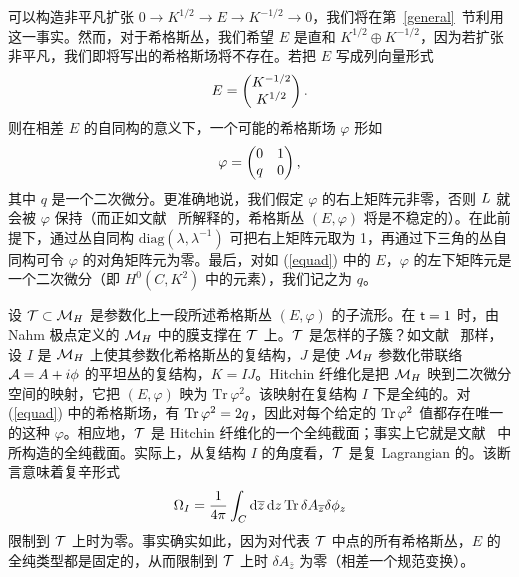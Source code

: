 可以构造非平凡扩张 $0\to K^{1/2}\to E\to K^{-1/2}\to 0$，我们将在第~\ref{general}~节利用这一事实。然而，对于希格斯丛，我们希望 $E$ 是直和 $K^{1/2}\oplus K^{-1/2}$，因为若扩张非平凡，我们即将写出的希格斯场将不存在。若把 $E$ 写成列向量形式
\begin{equation}\label{equad} E=\begin{pmatrix}K^{-1/2}\cr K^{1/2}\end{pmatrix}.\end{equation}
则在相差 $E$ 的自同构的意义下，一个可能的希格斯场 $\varphi$ 形如
\begin{equation}\label{varph}\varphi=\begin{pmatrix}0 & 1\cr q & 0 \end{pmatrix},\end{equation}
其中 $q$ 是一个二次微分。更准确地说，我们假定 $\varphi$ 的右上矩阵元非零，否则 ${ L}$ 就会被 $\varphi$ 保持（而正如文献~\cite{Hitchin} 所解释的，希格斯丛 $(E,\varphi)$ 将是不稳定的）。在此前提下，通过丛自同构 $\mathrm{diag}(\lambda,\lambda^{-1})$ 可把右上矩阵元取为 1，再通过下三角的丛自同构可令 $\varphi$ 的对角矩阵元为零。最后，对如 (\ref{equad}) 中的 $E$，$\varphi$ 的左下矩阵元是一个二次微分（即 $H^0(C,K^2)$ 中的元素），我们记之为 $q$。


设 ${\mathcal T}\subset {\mathcal M}_H$ 是参数化上一段所述希格斯丛 $(E,\varphi)$ 的子流形。在 ${ \sf t}=1$ 时，由 Nahm 极点定义的 ${\mathcal M}_H$ 中的膜支撑在 ${\mathcal T}$ 上。${\mathcal T}$ 是怎样的子簇？如文献~\cite{Hitchin} 那样，设 $I$ 是 ${\mathcal M}_H$ 上使其参数化希格斯丛的复结构，$J$ 是使 ${\mathcal M}_H$ 参数化带联络 ${\mathcal A}=A+i\phi$ 的平坦丛的复结构，$K=IJ$。Hitchin 纤维化是把 ${\mathcal M}_H$ 映到二次微分空间的映射，它把 $(E,\varphi)$ 映为 $\mathrm{Tr}\,\varphi^2$。该映射在复结构 $I$ 下是全纯的。对 (\ref{equad}) 中的希格斯场，有 ${\mathrm {Tr}}\,\varphi^2=2q$，因此对每个给定的 ${\mathrm {Tr}}\,\varphi^2$ 值都存在唯一的这种 $\varphi$。相应地，${\mathcal T}$ 是 Hitchin 纤维化的一个全纯截面；事实上它就是文献~\cite{Hitchin} 中所构造的全纯截面。实际上，从复结构 $I$ 的角度看，${\mathcal T}$ 是复 Lagrangian 的。该断言意味着复辛形式
\begin{equation}\label{Om}\Omega_I=\frac{1}{4\pi}\int_C{\mathrm d}\overline z\,{\mathrm d} z\,{\mathrm {Tr}}\,\delta A_{\overline z}\delta\phi_z
\end{equation}
限制到 ${\mathcal T}$ 上时为零。事实确实如此，因为对代表 ${\mathcal T}$ 中点的所有希格斯丛，$E$ 的全纯类型都是固定的，从而限制到 ${\mathcal T}$ 上时 $\delta A_{\bar z}$ 为零（相差一个规范变换）。

